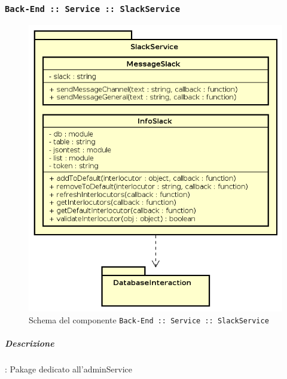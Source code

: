 \documentclass[../DefinizioneDiProdotto_v2.0.0.tex]{subfiles}
\begin{document}
\subsubsection{\texttt{Back-End :: Service :: SlackService}}
\begin{figure}[!h]
	\centering
	\includegraphics[scale=0.6]{Architettura/Back-End/Service/SlackService.png}
	\caption{Schema del componente \texttt{Back-End :: Service :: SlackService}}
\end{figure}
\subparagraph{Descrizione}: Pakage dedicato all'adminService
\end{document}
